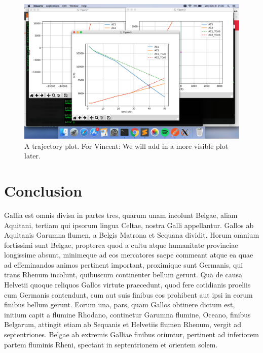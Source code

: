 \documentclass[journal, a4paper]{IEEEtran}
\begin{document}

    \begin{figure}[!hbt]
        \begin{center}
        \includegraphics[width=\columnwidth]{tf_plot.png}
        \caption{A trajectory plot. For Vincent: We will add in a more visible plot later.}
        \label{fig:tf_plot}
        \end{center}
    \end{figure}

\section{Conclusion}
    Gallia est omnis divisa in partes tres, quarum unam incolunt Belgae, aliam Aquitani, tertiam qui ipsorum lingua Celtae, nostra Galli appellantur. Gallos ab Aquitanis Garumna flumen, a Belgis Matrona et Sequana dividit. Horum omnium fortissimi sunt Belgae, propterea quod a cultu atque humanitate provinciae longissime absunt, minimeque ad eos mercatores saepe commeant atque ea quae ad effeminandos animos pertinent important, proximique sunt Germanis, qui trans Rhenum incolunt, quibuscum continenter bellum gerunt. Qua de causa Helvetii quoque reliquos Gallos virtute praecedunt, quod fere cotidianis proeliis cum Germanis contendunt, cum aut suis finibus eos prohibent aut ipsi in eorum finibus bellum gerunt. Eorum una, pars, quam Gallos obtinere dictum est, initium capit a flumine Rhodano, continetur Garumna flumine, Oceano, finibus Belgarum, attingit etiam ab Sequanis et Helvetiis flumen Rhenum, vergit ad septentriones. Belgae ab extremis Galliae finibus oriuntur, pertinent ad inferiorem partem fluminis Rheni, spectant in septentrionem et orientem solem.
\end{document}
